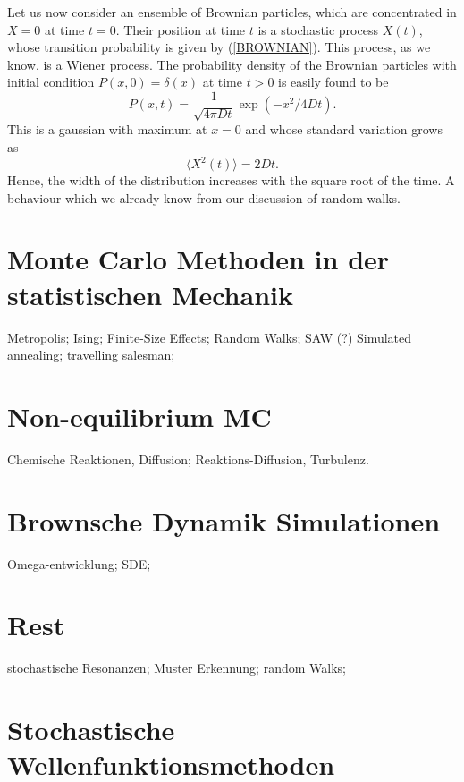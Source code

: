 Let us now consider an ensemble of Brownian particles, which are
concentrated in $X=0$ at time $t=0$. Their position at time $t$ is 
a stochastic process $X(t)$, whose transition probability is given 
by (\ref{BROWNIAN}). This process, as we know, is a Wiener 
process. The probability density of the Brownian particles  with 
initial condition $P(x,0) = \delta(x)$ at time $t>0$ is easily 
found to be
\begin{equation}
P(x,t) = \frac{1}{\sqrt{4 \pi D t}} \exp(-x^2/4Dt).
\end{equation}
This is a gaussian with maximum at $x=0$ and whose standard variation grows
as
\begin{equation}
\langle X^2(t) \rangle = 2 D t.
\end{equation}
Hence, the width of the distribution increases with the square 
root of the time. A behaviour which we already know from our 
discussion of random walks.








\chapter{Monte Carlo Methoden in der statistischen Mechanik}
Metropolis; Ising; Finite-Size Effects; Random Walks; SAW (?)
Simulated annealing; travelling salesman;

\chapter{Non-equilibrium MC}
Chemische Reaktionen, Diffusion; Reaktions-Diffusion, Turbulenz.

\chapter{Brownsche Dynamik Simulationen}
Omega-entwicklung; SDE;


\chapter{Rest}
stochastische Resonanzen; Muster Erkennung; random Walks;

\chapter{Stochastische Wellenfunktionsmethoden}

